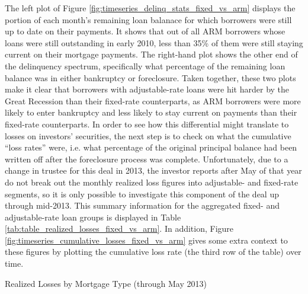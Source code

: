 \documentclass[12pt]{article}
\begin{document}
The left plot of Figure \ref{fig:timeseries_delinq_stats_fixed_vs_arm} displays the portion of each month's remaining loan balanace for which borrowers were still up to date on their payments. It shows that out of all ARM borrowers whose loans were still outstanding in early 2010, less than 35\% of them were still staying current on their mortgage payments. The right-hand plot shows the other end of the delinquency spectrum, specifically what percentage of the remaining loan balance was in either bankruptcy or foreclosure. Taken together, these two plots make it clear that borrowers with adjustable-rate loans were hit harder by the Great Recession than their fixed-rate counterparts, as ARM borrowers were more likely to enter bankruptcy and less likely to stay current on payments than their fixed-rate counterparts. In order to see how this differential might translate to losses on investors’ securities, the next step is to check on what the cumulative “loss rates” were, i.e. what percentage of the original principal balance had been written off after the foreclosure process was complete. Unfortunately, due to a change in trustee for this deal in 2013, the investor reports after May of that year do not break out the monthly realized loss figures into adjustable- and fixed-rate segments, so it is only possible to investigate this component of the deal up through mid-2013. This summary information for the aggregated fixed- and adjustable-rate loan groups is displayed in Table \ref{tab:table_realized_losses_fixed_vs_arm}. In addition, Figure \ref{fig:timeseries_cumulative_losses_fixed_vs_arm} gives some extra context to these figures by plotting the cumulative loss rate (the third row of the table) over time.

\begin{table}[h]
	\centering
	
	\caption{Realized Losses by Mortgage Type (through May 2013)}
	\label{tab:table_realized_losses_fixed_vs_arm}
\end{table}
\end{document}
